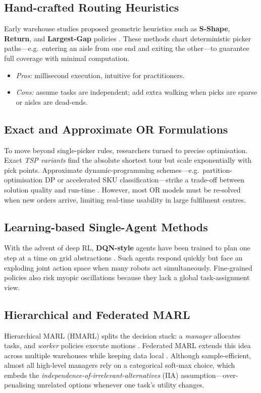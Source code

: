 \documentclass[journal]{IEEEtran}
\begin{document}
\subsection{Hand-crafted Routing Heuristics}
Early warehouse studies proposed geometric heuristics such as \textbf{S-Shape}, \textbf{Return}, and \textbf{Largest-Gap} policies \citep{ratliff1983sshape,de_koster1997optimal}.  
These methods chart deterministic picker paths—e.g.\ entering an aisle from one end and exiting the other—to guarantee full coverage with minimal computation.  
\vspace{-2pt}
\begin{itemize}[leftmargin=1.5em]
  \item[] \textit{Pros:} millisecond execution, intuitive for practitioners.  
  \item[] \textit{Cons:} assume tasks are independent; add extra walking when picks are sparse or aisles are dead-ends.
\end{itemize}

\subsection{Exact and Approximate OR Formulations}
To move beyond single-picker rules, researchers turned to precise optimisation.  
Exact \emph{TSP variants} find the absolute shortest tour but scale exponentially with pick points.  
Approximate dynamic-programming schemes—e.g.\ partition-optimisation DP or accelerated SKU classification—strike a trade-off between solution quality and run-time \citep{saylam2022partition,rao2023accelerated}.  
However, most OR models must be re-solved when new orders arrive, limiting real-time usability in large fulfilment centres.

\subsection{Learning-based Single-Agent Methods}
With the advent of deep RL, \textbf{DQN-style} agents have been trained to plan one step at a time on grid abstractions \citep{alam2024dqn}.  
Such agents respond quickly but face an exploding joint action space when many robots act simultaneously.  
Fine-grained policies also risk myopic oscillations because they lack a global task-assignment view.

\subsection{Hierarchical and Federated MARL}
Hierarchical MARL (HMARL) splits the decision stack: a \emph{manager} allocates tasks, and \emph{worker} policies execute motions \citep{krnjaic2023hierarchical}.  
Federated MARL extends this idea across multiple warehouses while keeping data local \citep{ho2024federated}.  
Although sample-efficient, almost all high-level managers rely on a categorical soft-max choice, which embeds the \emph{independence-of-irrelevant-alternatives} (IIA) assumption—over-penalising unrelated options whenever one task’s utility changes.
\end{document}
